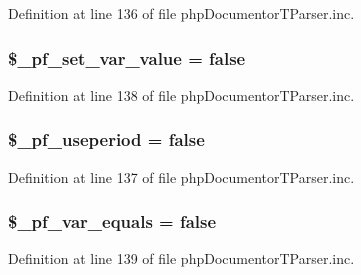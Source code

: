 \-Definition at line 136 of file php\-Documentor\-T\-Parser.\-inc.

\hypertarget{classphp_documentor_t_parser_a74c3be488455e13f36cebc0949e547f2}{
\subsubsection[{\$\-\_\-pf\-\_\-set\-\_\-var\-\_\-value}]{\setlength{\rightskip}{0pt plus 5cm}\$\-\_\-pf\-\_\-set\-\_\-var\-\_\-value = false}}\label{classphp_documentor_t_parser_a74c3be488455e13f36cebc0949e547f2}


\-Definition at line 138 of file php\-Documentor\-T\-Parser.\-inc.

\hypertarget{classphp_documentor_t_parser_a80e23d4532e12d073f2355cdc2f7c084}{
\subsubsection[{\$\-\_\-pf\-\_\-useperiod}]{\setlength{\rightskip}{0pt plus 5cm}\$\-\_\-pf\-\_\-useperiod = false}}\label{classphp_documentor_t_parser_a80e23d4532e12d073f2355cdc2f7c084}


\-Definition at line 137 of file php\-Documentor\-T\-Parser.\-inc.

\hypertarget{classphp_documentor_t_parser_ad347fb71856cf0006fa432147cdd0cdc}{
\subsubsection[{\$\-\_\-pf\-\_\-var\-\_\-equals}]{\setlength{\rightskip}{0pt plus 5cm}\$\-\_\-pf\-\_\-var\-\_\-equals = false}}\label{classphp_documentor_t_parser_ad347fb71856cf0006fa432147cdd0cdc}


\-Definition at line 139 of file php\-Documentor\-T\-Parser.\-inc.

